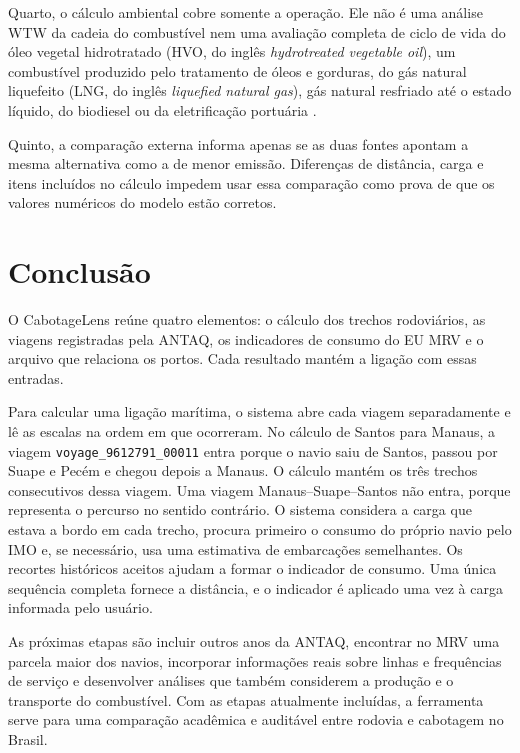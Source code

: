 \documentclass[12pt,a4paper]{report}
\begin{document}
\pagebreak
Quarto, o cálculo ambiental cobre somente a operação. Ele não é uma análise WTW da cadeia do combustível nem uma avaliação completa de ciclo de vida do óleo vegetal hidrotratado (HVO, do inglês \emph{hydrotreated vegetable oil}), um combustível produzido pelo tratamento de óleos e gorduras, do gás natural liquefeito (LNG, do inglês \emph{liquefied natural gas}), gás natural resfriado até o estado líquido, do biodiesel ou da eletrificação portuária \citep{lifecycle2020,maritimelca2024,decarb2024}.

Quinto, a comparação externa informa apenas se as duas fontes apontam a mesma alternativa como a de menor emissão. Diferenças de distância, carga e itens incluídos no cálculo impedem usar essa comparação como prova de que os valores numéricos do modelo estão corretos.

\chapter{Conclusão}
\label{chap:conclusao}

O CabotageLens reúne quatro elementos: o cálculo dos trechos rodoviários, as viagens registradas pela ANTAQ, os indicadores de consumo do EU MRV e o arquivo que relaciona os portos. Cada resultado mantém a ligação com essas entradas.

Para calcular uma ligação marítima, o sistema abre cada viagem separadamente e lê as escalas na ordem em que ocorreram. No cálculo de Santos para Manaus, a viagem \texttt{voyage\_9612791\_00011} entra porque o navio saiu de Santos, passou por Suape e Pecém e chegou depois a Manaus. O cálculo mantém os três trechos consecutivos dessa viagem. Uma viagem Manaus--Suape--Santos não entra, porque representa o percurso no sentido contrário. O sistema considera a carga que estava a bordo em cada trecho, procura primeiro o consumo do próprio navio pelo IMO e, se necessário, usa uma estimativa de embarcações semelhantes. Os recortes históricos aceitos ajudam a formar o indicador de consumo. Uma única sequência completa fornece a distância, e o indicador é aplicado uma vez à carga informada pelo usuário.

As próximas etapas são incluir outros anos da ANTAQ, encontrar no MRV uma parcela maior dos navios, incorporar informações reais sobre linhas e frequências de serviço e desenvolver análises que também considerem a produção e o transporte do combustível. Com as etapas atualmente incluídas, a ferramenta serve para uma comparação acadêmica e auditável entre rodovia e cabotagem no Brasil.


\end{document}
